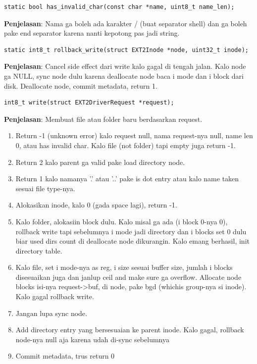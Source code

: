 \begin{lstlisting}
static bool has_invalid_char(const char *name, uint8_t name_len);
\end{lstlisting}

\textbf{Penjelasan}: Nama ga boleh ada karakter / (buat separator shell) dan ga boleh pake end separator karena nanti kepotong pas jadi string.

\begin{lstlisting}
static int8_t rollback_write(struct EXT2Inode *node, uint32_t inode);
\end{lstlisting}

\textbf{Penjelasan}: Cancel side effect dari write kalo gagal di tengah jalan. Kalo node ga NULL, sync node dulu karena deallocate node baca i mode dan i block dari disk. Deallocate node, commit metadata, return 1.

\begin{lstlisting}
int8_t write(struct EXT2DriverRequest *request);
\end{lstlisting}

\textbf{Penjelasan}:
Membuat file atau folder baru berdasarkan request.

\begin{enumerate}
    \item Return -1 (unknown error) kalo request null, nama request-nya null, name len 0, atau has invalid char. Kalo file (not folder) tapi empty juga return -1.
    \item Return 2 kalo parent ga valid pake load directory node.
    \item Return 1 kalo namanya '.' atau '..' pake is dot entry atau kalo name taken sesuai file type-nya.
    \item Alokasikan inode, kalo 0 (gada space lagi), return -1. 
    \item Kalo folder, alokasiin block dulu. Kalo misal ga ada (i block 0-nya 0), rollback write tapi sebelumnya i mode jadi directory dan i blocks set 0 dulu biar used dirs count di deallocate node dikurangin. Kalo emang berhasil, init directory table.
    \item Kalo file, set i mode-nya as reg, i size sesuai buffer size, jumlah i blocks disesuaikan juga dan janlup ceil and make sure ga overflow. Allocate node blocks isi-nya request->buf, di node, pake bgd (whichis group-nya si inode). Kalo gagal rollback write.
    \item Jangan lupa sync node.
    \item Add directory entry yang bersesuaian ke parent inode. Kalo gagal, rollback node-nya null aja karena udah di-sync sebelumnya
    \item Commit metadata, trus return 0
\end{enumerate}

